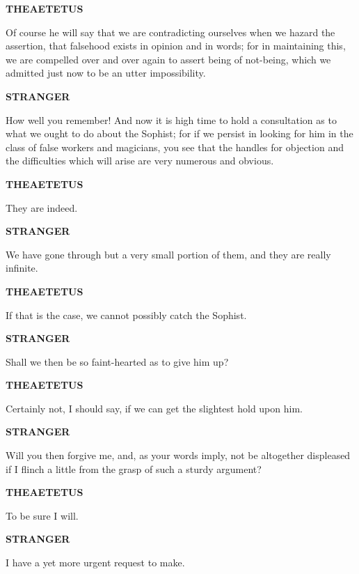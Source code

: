 \documentclass[11pt,letter]{article}
\begin{document}
\par \textbf{THEAETETUS}
\par   Of course he will say that we are contradicting ourselves when we hazard the assertion, that falsehood exists in opinion and in words; for in maintaining this, we are compelled over and over again to assert being of not-being, which we admitted just now to be an utter impossibility.

\par \textbf{STRANGER}
\par   How well you remember! And now it is high time to hold a consultation as to what we ought to do about the Sophist; for if we persist in looking for him in the class of false workers and magicians, you see that the handles for objection and the difficulties which will arise are very numerous and obvious.

\par \textbf{THEAETETUS}
\par   They are indeed.

\par \textbf{STRANGER}
\par   We have gone through but a very small portion of them, and they are really infinite.

\par \textbf{THEAETETUS}
\par   If that is the case, we cannot possibly catch the Sophist.

\par \textbf{STRANGER}
\par   Shall we then be so faint-hearted as to give him up?

\par \textbf{THEAETETUS}
\par   Certainly not, I should say, if we can get the slightest hold upon him.

\par \textbf{STRANGER}
\par   Will you then forgive me, and, as your words imply, not be altogether displeased if I flinch a little from the grasp of such a sturdy argument?

\par \textbf{THEAETETUS}
\par   To be sure I will.

\par \textbf{STRANGER}
\par   I have a yet more urgent request to make.
\end{document}
